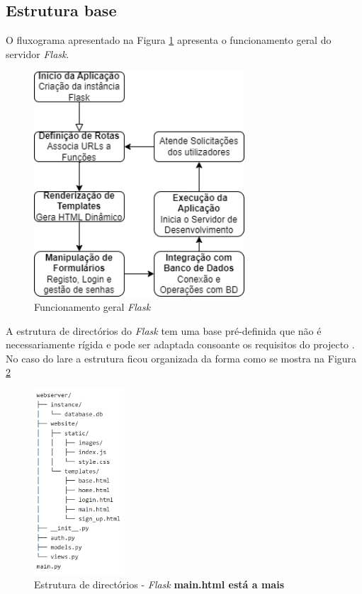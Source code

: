 \subsection{Estrutura base}
O fluxograma apresentado na Figura \ref{fig:funcflask} apresenta o funcionamento geral do servidor \textit{Flask}.

\begin{figure}[hbtp]
	\centering
	\includegraphics[width=0.7\textwidth]{figures/fluxograma_flask.drawio.png}
	\caption{Funcionamento geral \textit{Flask}}
	\label{fig:funcflask}
\end{figure}

A estrutura de directórios do \textit{Flask} tem uma base pré-definida que não é necessariamente rígida e pode ser adaptada consoante os requisitos do projecto \cite{Flask}. No caso do \acrshort{lare} a estrutura ficou organizada da forma como se mostra na Figura \ref{fig:estruturapastas}

\begin{figure}[hbtp]
	\centering
	\includegraphics[width=0.3\textwidth]{figures/tree_flask.png}
	\caption{Estrutura de directórios - \textit{Flask} \textbf{ main.html está a mais}}
	\label{fig:estruturapastas}
\end{figure}

